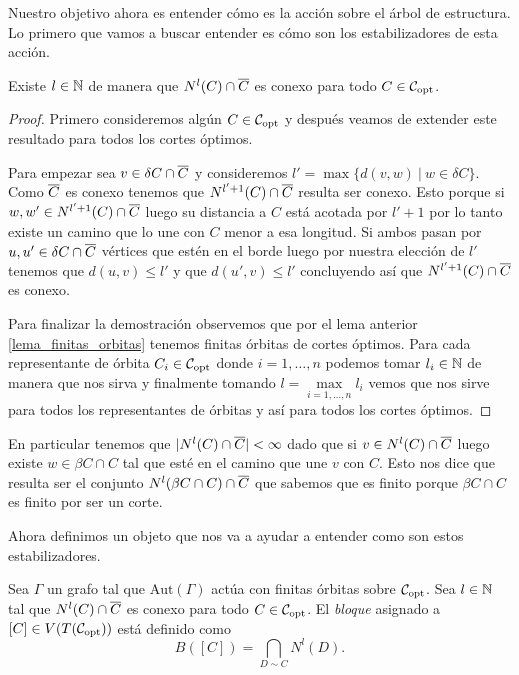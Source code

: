 \documentclass[tesis.tex]{subfiles}
\newcommand{\aut}{\text{Aut}}
\begin{document}
Nuestro objetivo ahora es entender cómo es la acción sobre el árbol de estructura. 
Lo primero que vamos a buscar entender es cómo son los estabilizadores de esta acción.

\begin{lema}\label{lema_nlC_cap_olC_conexo}
	Existe $l \in \mathbb{N}$ de manera que $N^l(C) \cap \overline C$ es conexo para todo $C \in {\cal C}_{\text{opt}}$.
\end{lema}
\begin{proof}
	Primero consideremos algún $C \in {\cal C}_{\text{opt}}$ y después veamos de extender este resultado para todos los cortes óptimos.
	
	Para empezar sea $v \in \delta C \cap \overline C$ y consideremos $l' = \max  \{d(v,w) \ | \ w \in \delta C\}$.
	Como $\overline C$ es conexo tenemos que $N^{l'+1}(C) \cap \overline C$ resulta ser conexo.
	Esto porque si $w,w' \in N^{l'+1}(C) \cap \overline C$ luego su distancia a $C$ está acotada por $l'+1$ por lo tanto existe un camino que lo une con $C$ menor a esa longitud.
	Si ambos pasan por $u,u' \in \delta C \cap \overline C$ vértices que estén en el borde luego por nuestra elección de $l'$ tenemos que $d(u,v) \le l'$ y que $d(u',v) \le l'$ concluyendo así que $N^{l'+1}(C) \cap \overline C$ es conexo.
	
	Para finalizar la demostración observemos que por el lema anterior \ref{lema_finitas_orbitas} tenemos finitas órbitas de cortes óptimos.
	Para cada representante de órbita $C_i \in {\cal C}_{\text{opt}}$ donde $i=1,\dots,n$ podemos tomar $l_i \in \mathbb{N}$ de manera que nos sirva y finalmente tomando $l = \underset{{i=1,\dots,n}}{\max} l_i$ vemos que nos sirve para todos los representantes de órbitas y así para todos los cortes óptimos.
\end{proof}
\begin{obs}
	En particular tenemos que $|N^l(C) \cap \overline C|<\infty$ dado que si $v \in N^l(C) \cap \overline C$ luego existe $w \in \beta C \cap C$ tal que esté en el camino que une $v$ con $C$.
	Esto nos dice que resulta ser el conjunto $N^l(\beta C  \cap C) \cap \overline C$ que sabemos que es finito porque $\beta C \cap C$ es finito por ser un corte.
\end{obs}
Ahora definimos un objeto que nos va a ayudar a entender como son estos estabilizadores.

\begin{deff}
	Sea $\Gamma$ un grafo tal que $\aut(\Gamma)$ actúa con finitas órbitas sobre ${\cal C}_{\text{opt}}$.
	Sea $l \in \mathbb{N}$ tal que $N^l(C) \cap \overline C$ es conexo para todo $C \in {\cal C}_{\text{opt}}$.
	El \emph{bloque} asignado a $[C] \in V(T({\cal C}_{\text{opt}}))$ está definido como
	\[
		B([C]) = \bigcap_{D \sim C} N^l (D).
	\]	
\end{deff}
\end{document}
